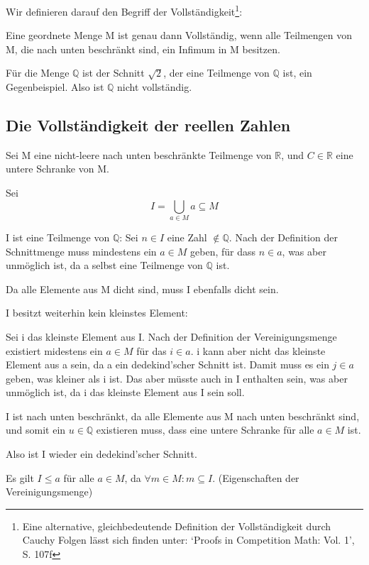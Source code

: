 \documentclass[12pt]{article}
\begin{document}
    Wir definieren darauf den Begriff der Vollständigkeit\footnote{
        Eine alternative, gleichbedeutende Definition der Vollständigkeit durch Cauchy Folgen lässt sich finden unter:
        `Proofs in Competition Math: Vol. 1', S. 107f
    }:

    Eine geordnete Menge M ist genau dann Vollständig, wenn alle Teilmengen von M, die nach unten beschränkt sind,
    ein Infimum in M besitzen.

    Für die Menge $\mathbb{Q}$ ist der Schnitt $\sqrt{2}$, der eine Teilmenge von $\mathbb{Q}$ ist, ein Gegenbeispiel.
    Also ist $\mathbb{Q}$ nicht vollständig.

    \subsection{Die Vollständigkeit der reellen Zahlen}

    Sei M eine nicht-leere nach unten beschränkte Teilmenge von $\mathbb{R}$, und $C \in \mathbb{R}$ eine untere Schranke von M.

    Sei
    \[I = \bigcup \limits_{a \in M} a \subseteq M\]

    I ist eine Teilmenge von $\mathbb{Q}$:
    Sei $n \in I$ eine Zahl $\not \in \mathbb{Q}$. Nach der Definition der Schnittmenge muss mindestens ein
    $a \in M$ geben, für dass $n \in a$, was aber unmöglich ist, da a selbst eine Teilmenge von $\mathbb{Q}$ ist.

    Da alle Elemente aus M dicht sind, muss I ebenfalls dicht sein.  %

    I besitzt weiterhin kein kleinstes Element:

    Sei i das kleinste Element aus I.
    Nach der Definition der Vereinigungsmenge existiert midestens ein $a \in M$ für das $i \in a$.
    i kann aber nicht das kleinste Element aus a sein, da a ein dedekind'scher Schnitt ist.
    Damit muss es ein $j \in a$ geben, was kleiner als i ist. Das aber müsste auch in I enthalten sein,
    was aber unmöglich ist, da i das kleinste Element aus I sein soll.

    I ist nach unten beschränkt, da alle Elemente aus M nach unten beschränkt sind, und somit ein
    $u \in \mathbb{Q}$ existieren muss, dass eine untere Schranke für alle $a \in M$ ist.

    Also ist I wieder ein dedekind'scher Schnitt.

    Es gilt $I \le a$ für alle $a \in M$, da $\forall m \in M: m \subseteq I$. (Eigenschaften der Vereinigungsmenge)
\end{document}
